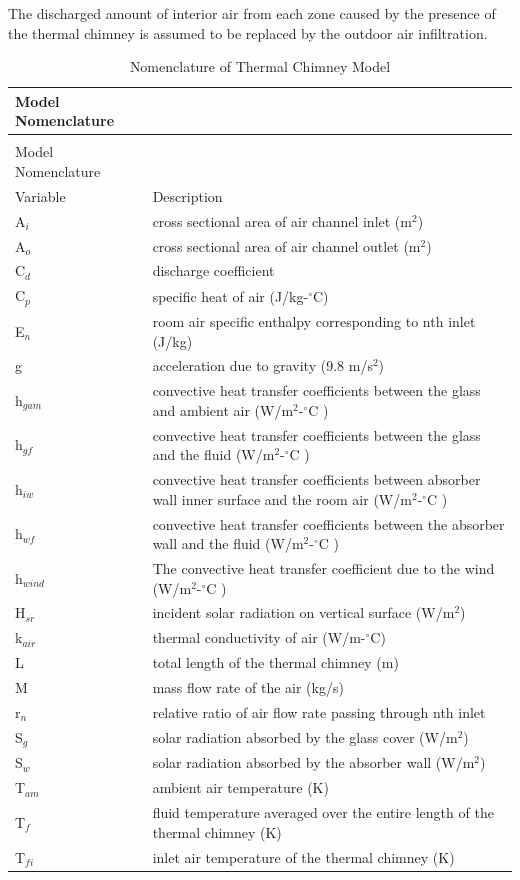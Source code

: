 The discharged amount of interior air from each zone caused by the presence of the thermal chimney is assumed to be replaced by the outdoor air infiltration.

\begin{longtable}[l]{p{1.5in}p{4.5in}}
\caption{Nomenclature of Thermal Chimney Model \label{table:nomenclature-of-thermal-chimney-model}} \tabularnewline
\toprule 
Model Nomenclature \tabularnewline
\midrule
\endfirsthead

\caption[]{Nomenclature of Thermal Chimney Model} \tabularnewline
\toprule 
Model Nomenclature \tabularnewline
\midrule
\endhead

Variable & Description \tabularnewline
A\(_{i}\) & cross sectional area of air channel inlet (m\(^{2}\)) \tabularnewline
A\(_{o}\) & cross sectional area of air channel outlet (m\(^{2}\)) \tabularnewline
C\(_{d}\) & discharge coefficient \tabularnewline
C\(_{p}\) & specific heat of air (J/kg-\(^{\circ}\)C) \tabularnewline
E\(_{n}\) & room air specific enthalpy corresponding to nth inlet (J/kg) \tabularnewline
g & acceleration due to gravity (9.8 m/s\(^{2}\)) \tabularnewline
h\(_{gam}\) & convective heat transfer coefficients between the glass and ambient air (W/m\(^{2}\)-\(^{\circ}\)C ) \tabularnewline
h\(_{gf}\) & convective heat transfer coefficients between the glass and the fluid (W/m\(^{2}\)-\(^{\circ}\)C ) \tabularnewline
h\(_{iw}\) & convective heat transfer coefficients between absorber wall inner surface and the room air (W/m\(^{2}\)-\(^{\circ}\)C ) \tabularnewline
h\(_{wf}\) & convective heat transfer coefficients between the absorber wall and the fluid (W/m\(^{2}\)-\(^{\circ}\)C ) \tabularnewline
h\(_{wind}\) & The convective heat transfer coefficient due to the wind (W/m\(^{2}\)-\(^{\circ}\)C ) \tabularnewline
H\(_{sr}\) & incident solar radiation on vertical surface (W/m\(^{2}\)) \tabularnewline
k\(_{air}\) & thermal conductivity of air (W/m-\(^{\circ}\)C) \tabularnewline
L & total length of the thermal chimney (m) \tabularnewline
M & mass flow rate of the air (kg/s) \tabularnewline
r\(_{n}\) & relative ratio of air flow rate passing through nth inlet \tabularnewline
S\(_{g}\) & solar radiation absorbed by the glass cover (W/m\(^{2}\)) \tabularnewline
S\(_{w}\) & solar radiation absorbed by the absorber wall (W/m\(^{2}\)) \tabularnewline
T\(_{am}\) & ambient air temperature (K) \tabularnewline
T\(_{f}\) & fluid temperature averaged over the entire length of the thermal chimney (K) \tabularnewline
T\(_{fi}\) & inlet air temperature of the thermal chimney (K) \tabularnewline

\end{longtable}
